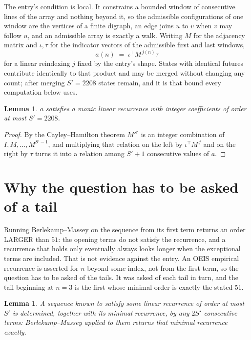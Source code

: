 \documentclass[11pt,a4paper]{article}
\theoremstyle{plain}
\newtheorem{lemma}[theorem]{Lemma}
\theoremstyle{definition}
\begin{document}
The entry's condition is local. It constrains a bounded window of consecutive lines of the
array and nothing beyond it, so the admissible configurations of one window are the vertices of
a finite digraph, an edge joins $u$ to $v$ when $v$ may follow $u$, and an admissible array is
exactly a walk. Writing $M$ for the adjacency matrix and $\iota,\tau$ for the indicator vectors
of the admissible first and last windows,
\[
a(n)\;=\;\iota^{\!\top}M^{\,j(n)}\tau
\]
for a linear reindexing $j$ fixed by the entry's shape. States with identical futures
contribute identically to that product and may be merged without changing any count; after
merging $S'=2208$ states remain, and it is that bound every computation below uses.

\begin{lemma}\label{lem:cf}
$a$ satisfies a monic linear recurrence with integer coefficients of order at most $S'=2208$.
\end{lemma}

\begin{proof}
By the Cayley--Hamilton theorem $M^{S'}$ is an integer combination of $I,M,\dots,M^{S'-1}$,
and multiplying that relation on the left by $\iota^{\!\top}M^{\,j}$ and on the right by
$\tau$ turns it into a relation among $S'+1$ consecutive values of $a$.
\end{proof}

\section{Why the question has to be asked of a tail}

Running Berlekamp--Massey on the sequence from its first term returns an order LARGER than $51$: the opening terms do not satisfy the recurrence, and a recurrence that holds only eventually always looks longer when the exceptional terms are included. That is not evidence against the entry. An OEIS empirical recurrence is asserted for $n$ beyond some index, not from the first term, so the question has to be asked of the tails. It was asked of each tail in turn, and the tail beginning at $n=3$ is the first whose minimal order is exactly the stated $51$.

\begin{lemma}\label{lem:bm}
A sequence known to satisfy some linear recurrence of order at most $S'$ is determined,
together with its minimal recurrence, by any $2S'$ consecutive terms: Berlekamp--Massey applied
to them returns that minimal recurrence exactly.
\end{lemma}
\end{document}
